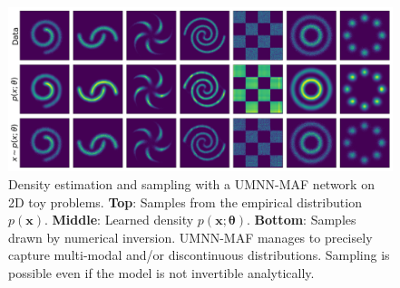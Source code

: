\documentclass{article}
\newcommand{\mc}{\mathcal}
\newcommand{\mb}{\boldsymbol}
\newcommand{\tbf}[1]{\textbf{#1}}
\begin{document}


\begin{figure}
    \centering
    \includegraphics[width=.85\textwidth]{figures/toy/all_flow.png}
    \vspace{-0.75em}
    \caption{Density estimation and sampling with a UMNN-MAF network on 2D toy problems. \tbf{Top}: Samples from the empirical distribution $p(\mb{x})$. \tbf{Middle}: Learned density $p(\mb{x};\mb{\theta})$. \tbf{Bottom}: Samples drawn by numerical inversion.
    UMNN-MAF manages to precisely capture multi-modal and/or discontinuous distributions.
    Sampling is possible even if the model is not invertible analytically.}
    \label{fig:toys}
\end{figure}
\end{document}

